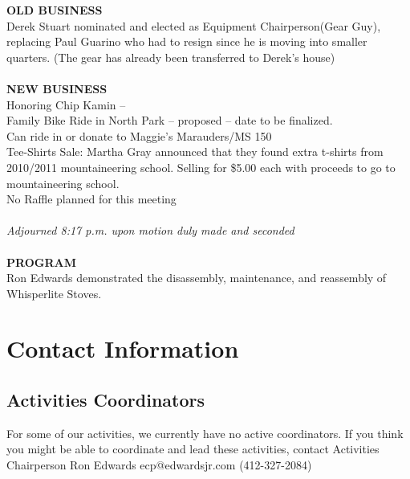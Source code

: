 \documentclass[10pt,a4paper]{article}
\newcommand\subsect[1]{%
  \subsection*{#1}%
  \addcontentsline{toc}{subsection}{#1}}
\newenvironment{Figure}
  {\par\medskip\noindent\minipage{\linewidth}}
  {\endminipage\par\medskip}
\begin{document}
\begin{multicols}{2}
\textbf{OLD BUSINESS}\\
Derek Stuart nominated and elected as Equipment Chairperson(Gear Guy), replacing Paul Guarino who had to resign since he is moving into smaller quarters. (The gear has already been transferred to Derek's house)
\\
\\
\textbf{NEW BUSINESS}\\
Honoring Chip Kamin –  \\
Family Bike Ride in North Park – proposed – date to be finalized. \\
Can ride in or donate to Maggie's Marauders/MS 150 \\
Tee-Shirts Sale: Martha Gray announced that they found extra t-shirts from 2010/2011 mountaineering school. Selling for \$5.00 each with proceeds to go to mountaineering school.\\
No Raffle planned for this meeting\\
\\
\textit{Adjourned  8:17 p.m. upon motion duly made and seconded}
\\
\\
\textbf{PROGRAM}\\
Ron Edwards demonstrated the disassembly, maintenance, and reassembly of Whisperlite Stoves.


\end{multicols}
\clearpage
\pagebreak
%
%
%
%
%


\pagebreak
\clearpage



\appendix

\section{Contact Information}

\subsection{Activities Coordinators}
For some of our activities, we currently have no active coordinators. If you think you might be able to coordinate
and lead these activities, contact Activities Chairperson Ron Edwards ecp@edwardsjr.com (412-327-2084)
\end{document}

